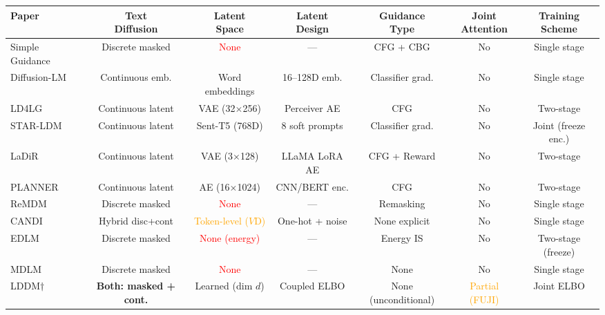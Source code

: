 \documentclass{article}
\begin{document}
\begin{table}[h]
\centering
\footnotesize
\setlength{\tabcolsep}{2pt}
\begin{adjustbox}{max width=\textwidth}
\begin{tabular}{@{}lcccccc@{}}
\toprule
\textbf{Paper} & \makecell{\textbf{Text}\\\textbf{Diffusion}} & \makecell{\textbf{Latent}\\\textbf{Space}} & \makecell{\textbf{Latent}\\\textbf{Design}} & \makecell{\textbf{Guidance}\\\textbf{Type}} & \makecell{\textbf{Joint}\\\textbf{Attention}} & \makecell{\textbf{Training}\\\textbf{Scheme}} \\
\midrule
Simple Guidance & Discrete masked & \textcolor{red}{None} & --- & CFG + CBG & No & Single stage \\
Diffusion-LM & Continuous emb. & Word embeddings & 16--128D emb. & Classifier grad. & No & Single stage \\
LD4LG & Continuous latent & \textcolor{green!60!black}{VAE (32$\times$256)} & Perceiver AE & CFG & No & Two-stage \\
STAR-LDM & Continuous latent & \textcolor{green!60!black}{Sent-T5 (768D)} & 8 soft prompts & Classifier grad. & No & Joint (freeze enc.) \\
LaDiR & Continuous latent & \textcolor{green!60!black}{VAE (3$\times$128)} & LLaMA LoRA AE & CFG + Reward & No & Two-stage \\
PLANNER & Continuous latent & \textcolor{green!60!black}{AE (16$\times$1024)} & CNN/BERT enc. & CFG & No & Two-stage \\
ReMDM & Discrete masked & \textcolor{red}{None} & --- & Remasking & No & Single stage \\
CANDI & Hybrid disc+cont & \textcolor{orange}{Token-level ($V$D)} & One-hot + noise & None explicit & No & Single stage \\
EDLM & Discrete masked & \textcolor{red}{None (energy)} & --- & Energy IS & No & Two-stage (freeze) \\
MDLM & Discrete masked & \textcolor{red}{None} & --- & None & No & Single stage \\
\midrule
LDDM$\dagger$ & \textbf{Both: masked + cont.} & \textcolor{green!60!black}{Learned (dim $d$)} & Coupled ELBO & None (unconditional) & \textcolor{orange}{Partial (FUJI)} & Joint ELBO \\

\end{tabular}
\end{adjustbox}
\end{table}
\end{document}
